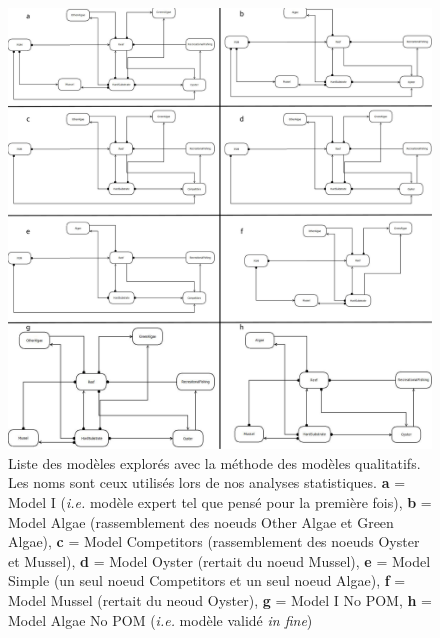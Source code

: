 \documentclass[12pt]{report}
\begin{document}
\begin{figure}
    \centering
    \includegraphics[width = \textwidth, height = .9\textheight]{dia_merged.pdf}
    \caption[]{Liste des modèles explorés avec la méthode des modèles qualitatifs. Les noms sont ceux utilisés lors de nos analyses statistiques. \textbf{a} = Model I (\textit{i.e.} modèle expert tel que pensé pour la première fois), \textbf{b} = Model Algae (rassemblement des noeuds Other Algae et Green Algae), \textbf{c} = Model Competitors (rassemblement des noeuds Oyster et Mussel), \textbf{d} = Model Oyster (rertait du noeud Mussel), \textbf{e} = Model Simple (un seul noeud Competitors et un seul noeud Algae), \textbf{f} = Model Mussel (rertait du neoud Oyster), \textbf{g} = Model I No POM, \textbf{h} = Model Algae No POM (\textit{i.e.} modèle validé \textit{in fine})}
    \label{fig:3anx}
\end{figure}
\end{document}
